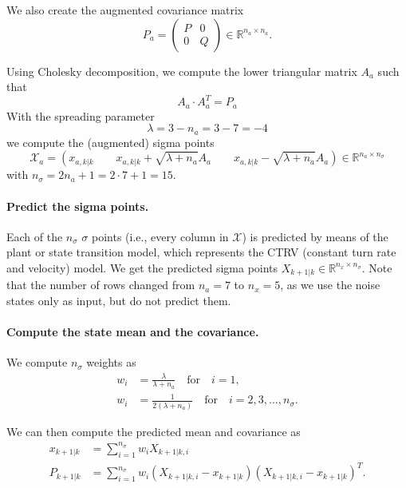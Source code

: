\documentclass{scrartcl}
\begin{document}
We also create the augmented covariance matrix
\begin{equation}
	P_a = \left( \begin{array}{cc}
				P & 0 \\
				0 & Q
				\end{array} \right) \in \mathbb{R}^{n_a \times n_a}.
\end{equation}

Using Cholesky decomposition, we compute the lower triangular matrix $A_a$ such that
\begin{equation}
	A_a \cdot A_a^T = P_a
\end{equation}
With the spreading parameter
\begin{equation}
	\lambda = 3 - n_a = 3 - 7 = -4
\end{equation}
we compute the (augmented) sigma points
\begin{equation}
	\mathcal{X}_a = \left(
	x_{a,k|k} \qquad x_{a,k|k} + \sqrt{\lambda+n_a} A_a \qquad x_{a,k|k} - \sqrt{\lambda+n_a} A_a
	 \right) \in \mathbb{R}^{n_a \times n_\sigma}
\end{equation}
with $n_\sigma = 2 n_a + 1 = 2 \cdot 7 + 1 = 15$.

\paragraph{Predict the sigma points.}
Each of the $n_\sigma$ $\sigma$ points (i.e., every column in $\mathcal{X}$)
is predicted by means of the plant or state transition model, which represents the CTRV
(constant turn rate and velocity) model.
We get the predicted sigma points $X_{k+1|k} \in \mathbb{R}^{n_x \times n_\sigma}$.
Note that the number of rows changed from $n_a = 7$ to $n_x = 5$, as we
use the noise states only as input, but do not predict them.

\paragraph{Compute the state mean and the covariance.}
We compute $n_\sigma$ weights as
\begin{align*}
	w_i &= \frac{\lambda}{\lambda + n_a} \quad \text{for} \quad i=1, \\
	w_i &= \frac{1}{2 (\lambda + n_a)} \quad \text{for} \quad i=2,3,\dots,n_\sigma.
\end{align*}

We can then compute the predicted mean and covariance as
\begin{align*}
	x_{k+1|k} &= \sum_{i=1}^{n_\sigma} w_i X_{k+1|k, i} \\
	P_{k+1|k} &= \sum_{i=1}^{n_\sigma} w_i
			\left( X_{k+1|k, i}-x_{k+1|k} \right)
			\left( X_{k+1|k, i}-x_{k+1|k} \right)^T.
\end{align*}
\end{document}
